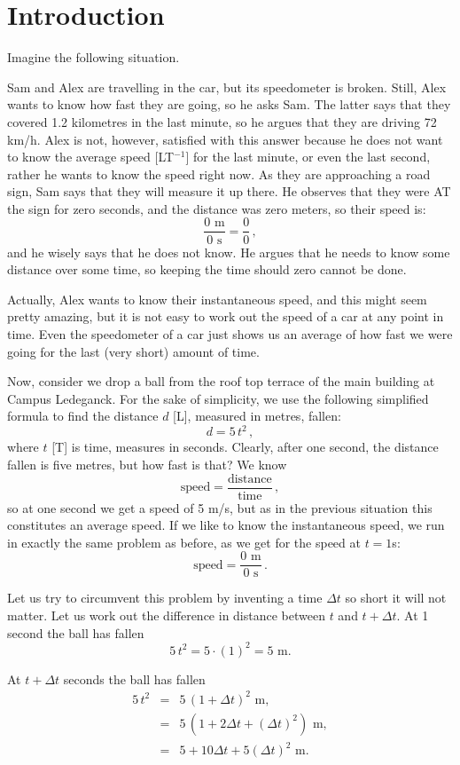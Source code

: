 \chapter{Introduction}
Imagine the following situation. 

Sam and Alex are travelling in the car, but its speedometer is broken. Still, Alex wants to know how fast they are going, so he asks Sam. The latter says that they covered 1.2 kilometres in the last minute, so he argues that they are driving 72 km/h. Alex is not, however, satisfied with this answer because he does not want to know the average speed [LT$^{-1}$] for the last minute, or even the last second, rather he wants to know the speed right now.  As they are approaching a road sign, Sam says that they will measure it up there. He observes that they were AT the sign for zero seconds, and the distance was zero meters, so their speed is:
$$
\dfrac{0\text{ m}}{0\text{ s}} = \dfrac{0}{0}\,,
$$
and he wisely says that he does not know. He argues that he needs to know some distance over some time, so keeping the time should zero cannot be done. 

Actually, Alex wants to know their instantaneous speed, and this might seem pretty amazing, but it is not easy to work out the speed of a car at any point in time. Even the speedometer of a car just shows us an average of how fast we were going for the last (very short) amount of time.

Now, consider we drop a ball from the roof top terrace of the main building at Campus Ledeganck. For the sake of simplicity, we use the following  simplified formula to find the distance $d$ [L], measured in metres, fallen:
$$
d=5\,t^2\,,
$$
where $t$ [T] is time, measures in seconds. Clearly, after one second, the distance fallen is five metres, but how fast is that? We know
$$
\text{speed}=\dfrac{\text{distance}}{\text{time}}\,,
$$
so at one second we get a speed of 5 m/s, but as in the previous situation this constitutes an average speed. If we  like to know the instantaneous speed, we run in exactly the same problem as before, as we get for the speed at $t=1$s:
$$
\text{speed}=\dfrac{0 \text{ m}}{0\text{ s}}\,.
$$

Let us try to circumvent this problem by inventing a time $\Delta t$ so short it will not matter. Let us  work out the difference in distance between $t$ and $t+\Delta t$. At 1 second the ball has fallen
$$
5\,t^2 = 5 \cdot (1)^2 = 5 \text{ m}.
$$

At $t+\Delta t$ seconds the ball has fallen
\begin{eqnarray*}
5\,t^2& =& 5 \, (1+\Delta t)^2 \text{ m},\\
&=&5 \, (1+2\Delta t+(\Delta t)^2) \text{ m},\\
&=&5 + 10\Delta t + 5(\Delta t)^2 \text{ m}.
\end{eqnarray*}

